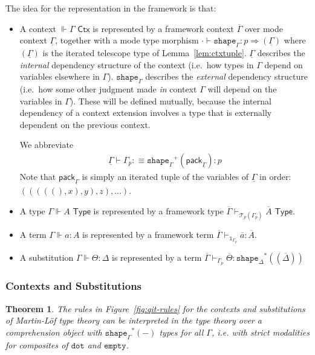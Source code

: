 \documentclass[10pt]{article}
\newtheorem{theorem}{Theorem}
\theoremstyle{definition}
\newcommand{\yields}{\vdash}
\newcommand{\tcell}{\Rightarrow}
\newcommand{\CTX}{\,\,\mathsf{Ctx}}
\newcommand{\TYPE}{\,\,\mathsf{Type}}
\newcommand\St[2]{\ensuremath{{#1}^*(#2)}}
\newcommand\TrPlus[2]{\ensuremath{{#1}^+(#2)}}
\newcommand\El[2]{\mathcal{T}_{#1}(#2)}
\newcommand\ctxtuple[1]{(#1)}
\newcommand\pack[1]{\ensuremath{\mathsf{pack}_{#1}}}
\newcommand{\modeof}[1]{{#1}_p}
\newcommand{\tdot}{\ensuremath{\mathtt{dot}}}
\newcommand{\tempty}{\ensuremath{\mathtt{empty}}}
\newcommand{\tshape}[1]{\ensuremath{\mathtt{shape}_{#1}}}
\newcommand{\qyields}{\Vdash}
\newcommand{\upstairs}[1]{\overline{#1}}
\newcommand{\downstairs}[1]{\underline{#1}}
\newcommand\One{\ensuremath{\mathds{1}}}
\begin{document}
The idea for the representation in the framework is that: 

\begin{itemize}
\item A context $\qyields \Gamma \CTX$ is represented by a framework
  context $\upstairs{\Gamma}$ over mode context $\downstairs{\Gamma}$,
  together with a mode type morphism $\cdot \yields \tshape{\Gamma} : p
  \tcell \ctxtuple{\downstairs{\Gamma}}$ where
  $\ctxtuple{\downstairs{\Gamma}}$ is the iterated telescope type of
  Lemma~\ref{lem:ctxtuple}.
  $\downstairs{\Gamma}$ describes the \emph{internal} dependency structure of the context (i.e.\ how types in $\Gamma$ depend on variables elsewhere in $\Gamma$).
  $\tshape{\Gamma}$ describes the \emph{external} dependency structure (i.e.\ how some other judgment made \emph{in} context $\Gamma$ will depend on the variables in $\Gamma$).
  These will be defined mutually, because the internal dependency of a
  context extension involves a type that is externally dependent on the
  previous context.  

  We abbreviate
  \begin{align*}
    \downstairs{\Gamma} \yields \modeof{\Gamma} :\equiv \TrPlus{\tshape{\Gamma}}{\pack{\downstairs{\Gamma}}} : p
  \end{align*}
  Note that $\pack{\downstairs{\Gamma}}$ is simply an iterated tuple of the variables of $\downstairs{\Gamma}$ in order: $(((((), x), y), z), \dots)$.
  
\item A type $\Gamma \qyields A \TYPE$ is represented by a framework type $\upstairs{\Gamma} \yields_{\El{p}{\modeof{\Gamma}}} \upstairs{A} \TYPE$.
\item A term $\Gamma \qyields a : A$ is represented by a framework term $\upstairs{\Gamma} \yields_{\One_{\modeof{\Gamma}}} \upstairs{a} : \upstairs{A}$.
\item A substitution $\Gamma \qyields \Theta : \Delta$ is represented by a term $\upstairs{\Gamma} \yields_{\modeof{\Gamma}} \upstairs{\Theta} : \St{\tshape{\Delta}}{\ctxtuple{\upstairs{\Delta}}}$
\end{itemize}

\subsubsection{Contexts and Substitutions}

\begin{theorem}
The rules in Figure~\ref{fig:qit-rules} for the contexts and
substitutions of Martin-L\"of type theory can be interpreted in the type
theory over a comprehension object with $\St{\tshape{\Gamma}}{-}$ types
for all $\Gamma$, i.e. with strict modalities for composites of $\tdot$
and $\tempty$.
\end{theorem}
\end{document}
